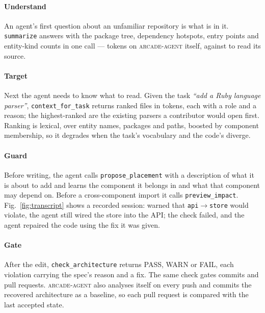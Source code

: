 \documentclass[10pt,conference]{IEEEtran}
\newcommand{\tool}[1]{\texttt{#1}}
\newcommand{\arcade}{\textsc{arcade-agent}}
\begin{document}
\paragraph*{Understand}
An agent's first question about an unfamiliar repository is what is in it.
\tool{summarize} answers with the package tree, dependency hotspots, entry
points and entity-kind counts in one call --- \SelfSummTok{} tokens on \arcade{}
itself, against \SelfRawTok{} to read its source.

\paragraph*{Target}
Next the agent needs to know what to read. Given the task \emph{``add a Ruby
language parser''}, \tool{context\_for\_task} returns \CtxFiles{} ranked files in
\CtxTok{} tokens, each with a role and a reason; the highest-ranked are the
existing parsers a contributor would open first. Ranking is lexical, over entity
names, packages and paths, boosted by component membership, so it degrades when
the task's vocabulary and the code's diverge.

\paragraph*{Guard}
Before writing, the agent calls \tool{propose\_placement} with a description of
what it is about to add and learns the component it belongs in and what that
component may depend on. Before a cross-component import it calls
\tool{preview\_impact}. Fig.~\ref{fig:transcript} shows a recorded session:
warned that \tool{api}$\rightarrow$\tool{store} would violate, the agent still
wired the store into the API; the check failed, and the agent repaired the code
using the fix it was given.

\paragraph*{Gate}
After the edit, \tool{check\_architecture} returns PASS, WARN or FAIL, each
violation carrying the spec's reason and a fix. The same check gates commits and
pull requests. \arcade{} also analyses itself on every push and commits the
recovered architecture as a baseline, so each pull request is compared with the
last accepted state.
\end{document}
